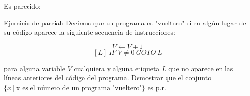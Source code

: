 \documentclass[10pt]{beamer}
\begin{document}

\begin{frame}{Es parecido:} %

	Ejercicio de parcial: Decimos que un programa es "vueltero" si en algún lugar de su código aparece la siguiente secuencia de instrucciones:
	
	$$V\leftarrow V+1$$
	$$[L]\ IF\ V \neq 0\ GOTO\ L$$
	
	para alguna variable $V$ cualquiera y alguna etiqueta $L$ que no aparece en las líneas anteriores del código del programa.
	Demostrar que el conjunto $\{x\ |\ \text{x es el número de un programa "vueltero"}\}$ es p.r.

\end{frame}
\end{document}
